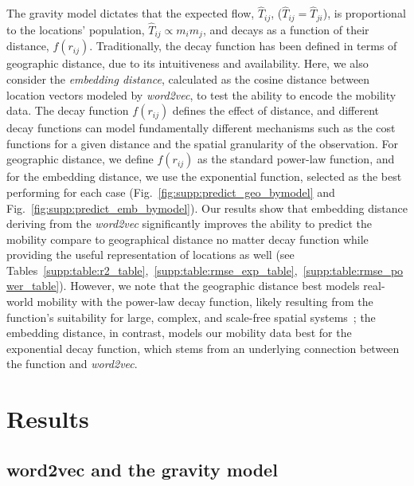 \documentclass[12pt]{article} %
\begin{document}
The gravity model dictates that the expected flow, $\hat{T}_{ij}$, ($\hat{T}_{ij }= \hat{T}_{ji}$), is proportional to the locations' population, $\hat{T}_{ij} \propto m_{i} m_{j}$, and decays as a function of their distance, $f(r_{ij})$.
Traditionally, the decay function has been defined in terms of geographic distance, due to its intuitiveness and availability.
Here, we also consider the \textit{embedding distance}, calculated as the cosine distance between location vectors modeled by \textit{word2vec}, to test the ability to encode the mobility data.
The decay function $f(r_{ij})$ defines the effect of distance, and different decay functions can model fundamentally different mechanisms \autocite{barthelemy2011spatial} such as the cost functions for a given distance and the spatial granularity of the observation.
For geographic distance, we define $f(r_{ij})$ as the standard power-law function, and for the embedding distance, we use the exponential function, selected as the best performing for each case (Fig.~\ref{fig:supp:predict_geo_bymodel} and Fig.~\ref{fig:supp:predict_emb_bymodel}).
Our results show that embedding distance deriving from the \textit{word2vec} significantly improves the ability to predict the mobility compare to geographical distance no matter decay function while providing the useful representation of locations as well (see Tables~\ref{supp:table:r2_table},~\ref{supp:table:rmse_exp_table},~\ref{supp:table:rmse_power_table}).
However, we note that the geographic distance best models real-world mobility with the power-law decay function, likely resulting from the function's suitability for large, complex, and scale-free spatial systems~\autocite{chen2015distance};
the embedding distance, in contrast, models our mobility data best for the exponential decay function, which stems from an underlying connection between the function and \textit{word2vec}.

\section*{Results}
%
\subsection*{word2vec and the gravity model}
\end{document}
